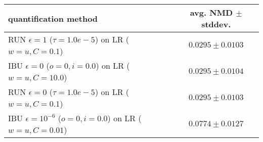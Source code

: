 \begin{tabular}{lc}
  \toprule
  quantification method & avg. NMD $\pm$ stddev. \\
  \midrule
  RUN $\epsilon=1$ ($\tau=1.0e-5$) on LR ($w=u, C=0.1$) & $\mathbf{0.0295 \pm 0.0103}$ \\
  IBU $\epsilon=0$ ($o=0, i=0.0$) on LR ($w=u, C=10.0$) & $\mathbf{0.0295 \pm 0.0104}$ \\
  RUN $\epsilon=0$ ($\tau=1.0e-5$) on LR ($w=u, C=0.1$) & $0.0295 \pm 0.0103$ \\
  IBU $\epsilon=10^{-6}$ ($o=0, i=0.0$) on LR ($w=u, C=0.01$) & $0.0774 \pm 0.0127$ \\
  \bottomrule
\end{tabular}
